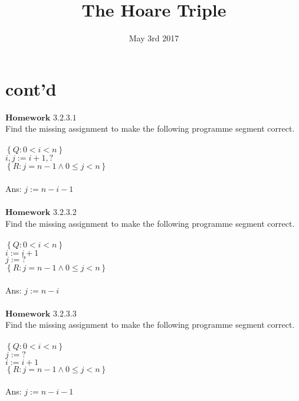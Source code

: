 \documentclass{article}
\title{The Hoare Triple}
\date{May 3rd 2017}
\begin{document}
\maketitle

\section{cont'd}
$\mathbf{Homework}$  $\mathbf{3.2.3.1}$
\\
Find the missing assignment to make the following programme segment correct.
\\
\\
$\left\{Q : 0 < i < n\right\}$
\\
$i, j := i + 1, ?$
\\
$\left\{R : j = n - 1 \land 0 \leq j < n \right\}$
\\
\\
Ans: $j := n - i - 1$
\\
\\
$\mathbf{Homework}$  $\mathbf{3.2.3.2}$
\\
Find the missing assignment to make the following programme segment correct.
\\
\\
$\left\{Q : 0 < i < n\right\}$
\\
$ i := i + 1$
\\
$ j := ?$
\\
$\left\{R : j = n - 1 \land 0 \leq j < n \right\}$
\\
\\
Ans: $ j := n - i$
\\
\\
$\mathbf{Homework}$  $\mathbf{3.2.3.3}$
\\
Find the missing assignment to make the following programme segment correct.
\\
\\
$\left\{Q : 0 < i < n\right\}$
\\
$ j := ? $
\\
$ i := i + 1 $
\\
$\left\{R : j = n - 1 \land 0 \leq j < n\right\}$
\\
\\
Ans: $ j := n - i - 1$
\\
\\
\end{document}
